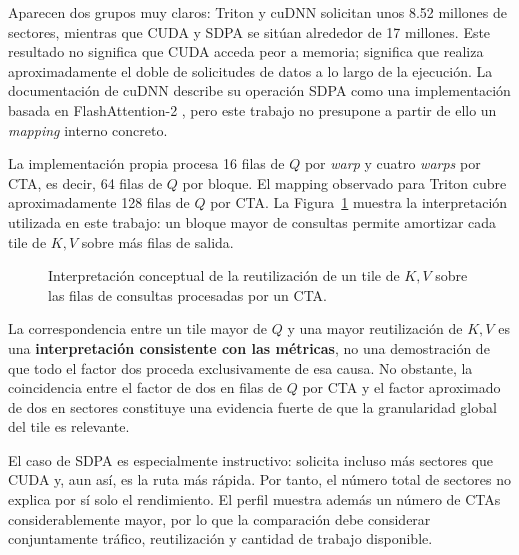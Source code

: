Aparecen dos grupos muy claros: Triton y cuDNN solicitan unos 8.52 millones de sectores, mientras que CUDA y SDPA se sitúan alrededor de 17 millones. Este resultado no significa que CUDA acceda peor a memoria; significa que realiza aproximadamente el doble de solicitudes de datos a lo largo de la ejecución. La documentación de cuDNN describe su operación SDPA como una implementación basada en FlashAttention-2 \cite{cudnnAttention}, pero este trabajo no presupone a partir de ello un \textit{mapping} interno concreto.

La implementación propia procesa 16 filas de \(Q\) por \textit{warp} y cuatro \textit{warps} por CTA, es decir, 64 filas de \(Q\) por bloque. El mapping observado para Triton cubre aproximadamente 128 filas de \(Q\) por CTA. La Figura~\ref{fig:reuse_kv} muestra la interpretación utilizada en este trabajo: un bloque mayor de consultas permite amortizar cada tile de \(K,V\) sobre más filas de salida.

\begin{figure}[H]
\centering
{}
\caption{Interpretación conceptual de la reutilización de un tile de \(K,V\) sobre las filas de consultas procesadas por un CTA.}
\label{fig:reuse_kv}
\end{figure}

La correspondencia entre un tile mayor de \(Q\) y una mayor reutilización de \(K,V\) es una \textbf{interpretación consistente con las métricas}, no una demostración de que todo el factor dos proceda exclusivamente de esa causa. No obstante, la coincidencia entre el factor de dos en filas de \(Q\) por CTA y el factor aproximado de dos en sectores constituye una evidencia fuerte de que la granularidad global del tile es relevante.

El caso de SDPA es especialmente instructivo: solicita incluso más sectores que CUDA y, aun así, es la ruta más rápida. Por tanto, el número total de sectores no explica por sí solo el rendimiento. El perfil muestra además un número de CTAs considerablemente mayor, por lo que la comparación debe considerar conjuntamente tráfico, reutilización y cantidad de trabajo disponible.

